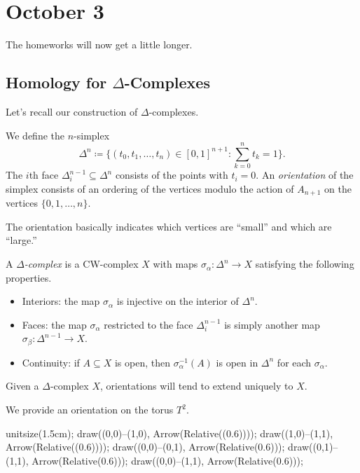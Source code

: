 \documentclass[../notes.tex]{subfiles}
\begin{document}
\section{October 3}

The homeworks will now get a little longer.

\subsection{Homology for \texorpdfstring{$\Delta$}{ Delta}-Complexes}
Let's recall our construction of $\Delta$-complexes.
\begin{definition}[simplex]
	We define the $n$-simplex
	\[\Delta^n\coloneqq\Bigg\{(t_0,t_1,\ldots,t_n)\in[0,1]^{n+1}:\sum_{k=0}^nt_k=1\Bigg\}.\]
	The $i$th face $\Delta_i^{n-1}\subseteq\Delta^n$ consists of the points with $t_i=0$. An \textit{orientation} of the simplex consists of an ordering of the vertices modulo the action of $A_{n+1}$ on the vertices $\{0,1,\ldots,n\}$.
\end{definition}
The orientation basically indicates which vertices are ``small'' and which are ``large.''
\begin{defihelper} 
	A \textit{$\Delta$-complex} is a CW-complex $X$ with maps $\sigma_\alpha\colon\Delta^n\to X$ satisfying the following properties.
	\begin{itemize}
		\item Interiors: the map $\sigma_\alpha$ is injective on the interior of $\Delta^n$.
		\item Faces: the map $\sigma_\alpha$ restricted to the face $\Delta_i^{n-1}$ is simply another map $\sigma_\beta\colon\Delta^{n-1}\to X$.
		\item Continuity: if $A\subseteq X$ is open, then $\sigma_\alpha^{-1}(A)$ is open in $\Delta^n$ for each $\sigma_\alpha$.
	\end{itemize}
\end{defihelper}
Given a $\Delta$-complex $X$, orientations will tend to extend uniquely to $X$.
\begin{example}
	We provide an orientation on the torus $T^2$.
	\begin{center}
		\begin{asy}
			unitsize(1.5cm);
			draw((0,0)--(1,0), Arrow(Relative((0.6))));
			draw((1,0)--(1,1), Arrow(Relative((0.6))));
			draw((0,0)--(0,1), Arrow(Relative(0.6)));
			draw((0,1)--(1,1), Arrow(Relative(0.6)));
			draw((0,0)--(1,1), Arrow(Relative(0.6)));
		\end{asy}
	\end{center}
\end{example}
\end{document}

